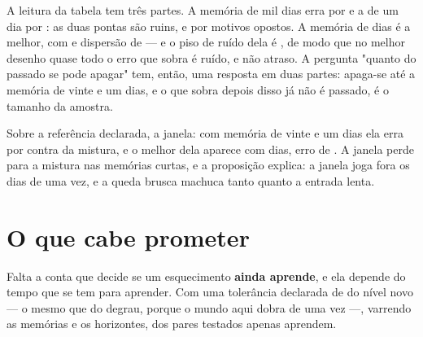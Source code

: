 A leitura da tabela tem três partes. A memória de mil dias erra por \numEsquecimentoErroMil{} e a de
um dia por \numEsquecimentoErroUm{}: as duas pontas são ruins, e por motivos opostos. A memória de
\numEsquecimentoMelhorMemoria{} dias é a melhor, com \numEsquecimentoErroVinteEUm{} e dispersão de
\numEsquecimentoMelhorDispersao{} --- e o piso de ruído dela é \numEsquecimentoPisoNaMelhor{}, de modo
que no melhor desenho quase todo o erro que sobra é ruído, e não atraso. A pergunta "quanto do passado se pode apagar" tem, então, uma resposta em duas partes:
apaga-se até a memória de vinte e um dias, e o que sobra depois disso já não é passado, é o tamanho
da amostra.

Sobre a referência declarada, a janela: com memória de vinte e um dias ela erra por
\numEsquecimentoJanelaVinteEUm{} contra \numEsquecimentoErroVinteEUm{} da mistura, e o melhor dela
aparece com \numEsquecimentoMelhorJanela{} dias, erro de \numEsquecimentoMelhorJanelaErro{}. A
janela perde para a mistura nas memórias curtas, e a proposição explica: a janela joga fora os dias de
uma vez, e a queda brusca machuca tanto quanto a entrada lenta.

\section{O que cabe prometer}

Falta a conta que decide se um esquecimento \textbf{ainda aprende}, e ela depende do tempo que se tem
para aprender. Com uma tolerância declarada de \numEsquecimentoTolerancia{} do nível novo --- o
mesmo que \numEsquecimentoToleranciaDegrau{} do degrau, porque o mundo aqui dobra de uma vez ---,
varrendo as memórias e os horizontes, dos \numEsquecimentoParesTodos{} pares testados apenas
\numEsquecimentoParesViaveis{} aprendem.


